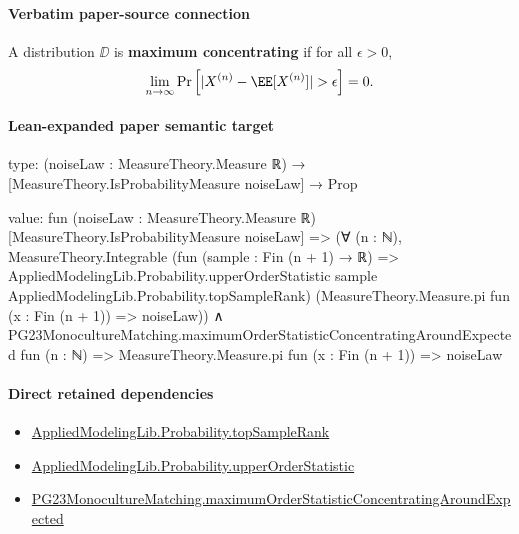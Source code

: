\documentclass[10pt]{article}
\begin{document}
\paragraph{Verbatim paper-source connection}
\begin{ReviewVerbatim}
\begin{definition}\label{def:maximum-concentrating}
    A distribution $\DD$ is \textbf{maximum concentrating} if for all $\epsilon > 0$,
    \begin{equation}
        \lim_{n\rightarrow \infty} \Pr\left[|X^{(n)} - \EE[X^{(n)}]| > \epsilon\right] = 0.
    \end{equation}
\end{definition}
\end{ReviewVerbatim}



\paragraph{Lean-expanded paper semantic target}
\begin{ReviewVerbatim}
type:
(noiseLaw : MeasureTheory.Measure ℝ) → [MeasureTheory.IsProbabilityMeasure noiseLaw] → Prop

value:
fun (noiseLaw : MeasureTheory.Measure ℝ) [MeasureTheory.IsProbabilityMeasure noiseLaw] =>
  (∀ (n : ℕ),
      MeasureTheory.Integrable
        (fun (sample : Fin (n + 1) → ℝ) =>
          AppliedModelingLib.Probability.upperOrderStatistic sample AppliedModelingLib.Probability.topSampleRank)
        (MeasureTheory.Measure.pi fun (x : Fin (n + 1)) => noiseLaw)) ∧
    PG23MonocultureMatching.maximumOrderStatisticConcentratingAroundExpected fun (n : ℕ) =>
      MeasureTheory.Measure.pi fun (x : Fin (n + 1)) => noiseLaw
\end{ReviewVerbatim}

\paragraph{Direct retained dependencies}
\begin{itemize}\raggedright
\item \hyperlink{governing-declaration-d58648457b8a1e1a}{Applied\allowbreak{}Modeling\allowbreak{}Lib.\allowbreak{}Probability.\allowbreak{}top\allowbreak{}Sample\allowbreak{}Rank}
\item \hyperlink{governing-declaration-cdeff774dc07136a}{Applied\allowbreak{}Modeling\allowbreak{}Lib.\allowbreak{}Probability.\allowbreak{}upper\allowbreak{}Order\allowbreak{}Statistic}
\item \hyperlink{governing-declaration-13cb30ab46a7240a}{PG23\allowbreak{}Monoculture\allowbreak{}Matching.\allowbreak{}maximum\allowbreak{}Order\allowbreak{}Statistic\allowbreak{}Concentrating\allowbreak{}Around\allowbreak{}Expected}
\end{itemize}
\end{document}
